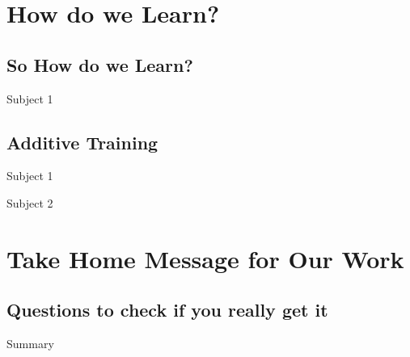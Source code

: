 \documentclass[hyperref={pdfpagelabels=false}]{beamer}
\begin{document}
\section{How do we Learn?}
\subsection{So How do we Learn?}
\begin{frame}{Subject 1}
\end{frame}
\subsection{Additive Training}
\begin{frame}{Subject 1}
\end{frame}

\begin{frame}{Subject 2}
\end{frame}


\section{Take Home Message for Our Work}
\subsection{Questions to check if you really get it}
\begin{frame}{Summary}
\end{frame}
\end{document}
